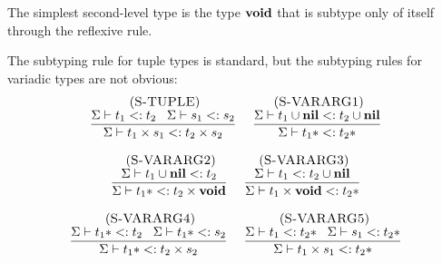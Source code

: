 The simplest second-level type is the type $\mathbf{void}$ that
is subtype only of itself through the reflexive rule.

The subtyping rule for tuple types is standard, but the subtyping
rules for variadic types are not obvious:
\[
\begin{array}{c}
\begin{array}{c}
\; (\textsc{S-TUPLE})\\
\dfrac{\Sigma \vdash t_{1} <: t_{2} \;\;\;
       \Sigma \vdash s_{1} <: s_{2}}
      {\Sigma \vdash t_{1} \times s_{1} <: t_{2} \times s_{2}}
\end{array}
\;
\begin{array}{c}
\; (\textsc{S-VARARG1})\\
\dfrac{\Sigma \vdash t_{1} \cup \mathbf{nil} <: t_{2} \cup \mathbf{nil}}
      {\Sigma \vdash t_{1}{*} <: t_{2}{*}}
\end{array}
\\ \\
\begin{array}{c}
\; (\textsc{S-VARARG2})\\
\dfrac{\Sigma \vdash t_{1} \cup \mathbf{nil} <: t_{2}}
      {\Sigma \vdash t_{1}{*} <: t_{2} \times \mathbf{void}}
\end{array}
\;
\begin{array}{c}
\; (\textsc{S-VARARG3})\\
\dfrac{\Sigma \vdash t_{1} <: t_{2} \cup \mathbf{nil}}
      {\Sigma \vdash t_{1} \times \mathbf{void} <: t_{2}{*}}
\end{array}
\\ \\
\begin{array}{c}
\; (\textsc{S-VARARG4})\\
\dfrac{\Sigma \vdash t_{1}{*} <: t_{2} \;\;\;
       \Sigma \vdash t_{1}{*} <: s_{2}}
      {\Sigma \vdash t_{1}{*} <: t_{2} \times s_{2}}
\end{array}
\;
\begin{array}{c}
\; (\textsc{S-VARARG5})\\
\dfrac{\Sigma \vdash t_{1} <: t_{2}{*} \;\;\;
       \Sigma \vdash s_{1} <: t_{2}{*}}
      {\Sigma \vdash t_{1} \times s_{1} <: t_{2}{*}}
\end{array}
\end{array}
\]

